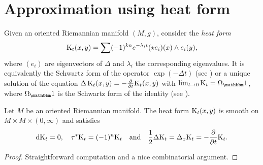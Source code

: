 \documentclass[\MainFolder/Text.tex]{subfiles}
\begin{document}
\section{Approximation using heat form}\label{Sec:Hwe}
\allowdisplaybreaks

Given an oriented Riemannian manifold $(M,g)$, consider the \emph{heat form}
\begin{equation}\label{Eq:HK}
\mathrm{K}_t(x,y) = \sum (-1)^{kn}e^{-\lambda_i t} (\star e_i)(x) \wedge e_i(y),
\end{equation}
where $(e_i)$ are eigenvectors of $\Delta$ and $\lambda_i$ the corresponding eigenvalues. It is equivalently the Schwartz form of the operator $\exp(-\Delta t)$ (see \cite[Chapter~3]{Harris2004}) or a unique solution of the equation $\operatorname{\Delta} \mathrm{K}_t(x,y) = - \frac{\partial}{\partial t}\mathrm{K}_t(x,y)$ with $\lim_{t\to 0} \KKer_t = \DR_\Id$, where $\DR_\Id$ is the Schwartz form of the identity (see \cite{Hein2006}).
%
\begin{Proposition}\label{Prop:Heasd}
Let $M$ be an oriented Riemannian manifold. The heat form $\mathrm{K}_t(x,y)$ is smooth on $M\times M \times (0,\infty)$ and satisfies
$$ \mathrm{d} \mathrm{K}_t = 0, \quad \tau^*\mathrm{K}_t = (-1)^n\mathrm{K}_t\quad\text{and}\quad \frac{1}{2}\Delta \mathrm{K}_t = \Delta_x \mathrm{K}_t = - \frac{\partial }{\partial t} \mathrm{K}_t. $$
\end{Proposition}
\begin{proof}
Straightforward computation and a nice combinatorial argument.
\end{proof}
%
\end{document}
